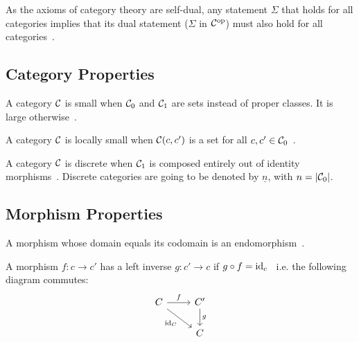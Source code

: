 \begin{remark}
  As the axioms of category theory are self-dual, any statement $\Sigma$ that
  holds for all categories implies that its dual statement ($\Sigma$ in
  $\mathcal{C}^{\mathrm{op}}$) must also hold for all
  categories~\parencite[p.~16]{leinster:basic_category_theory}.
\end{remark}

\subsection{Category Properties}

\begin{definition}
  A category $\mathcal{C}$ is small when $\mathcal{C}_0$ and $\mathcal{C}_1$ are sets instead of proper
  classes. It is large otherwise~\parencite[p.~24]{awodey:category_theory}.
\end{definition}

\begin{definition}
  A category $\mathcal{C}$ is locally small when $\mathcal{C}(c, c')$ is a set for all $c,c'\in
  \mathcal{C}_0$~\parencite[p.~25]{awodey:category_theory}.
\end{definition}

\begin{definition}
  A category $\mathcal{C}$ is discrete when $\mathcal{C}_1$ is composed entirely out of identity
  morphisms~\parencite[p.~11]{awodey:category_theory}. Discrete categories are going to
  be denoted by $\underline{n}$, with $n=|\mathcal{C}_0|$.
\end{definition}

\subsection{Morphism Properties}

\begin{definition}
  A morphism whose domain equals its codomain is an
  endomorphism~\parencite[p.~7]{riehl:category_theory_in_context}.
\end{definition}

\begin{definition}
  A morphism $f: c\to c'$ has a left inverse $g: c'\to c$ if $g\circ f =
  \mathrm{id}_c$~\parencite[p.~19]{lane:working_mathematician} i.e. the following
  diagram commutes:
  \[\begin{tikzcd}[ampersand replacement=\&]
    C \& {C'} \\
    \& C
    \arrow["f", from=1-1, to=1-2]
    \arrow["g", from=1-2, to=2-2]
    \arrow["{\id_C}"', from=1-1, to=2-2]
  \end{tikzcd}\]
\end{definition}

